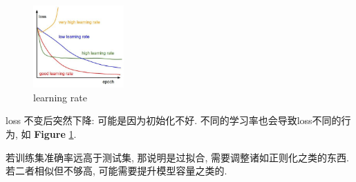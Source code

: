 \begin{figure}[!htb]
    \centering
    \includegraphics[width=0.309\textwidth]{pic/Lec6/learning rate.png}
    \caption{learning rate}
    \label{learning rate}
\end{figure}

loss 不变后突然下降: 可能是因为初始化不好. 不同的学习率也会导致loss不同的行为, 如 \textbf{Figure} \ref{learning rate}. 

若训练集准确率远高于测试集, 那说明是过拟合, 需要调整诸如正则化之类的东西. 若二者相似但不够高, 可能需要提升模型容量之类的. 
